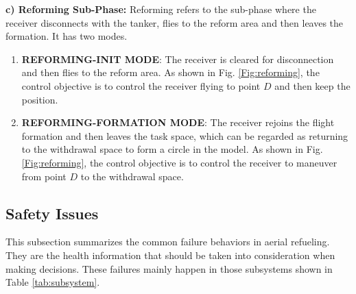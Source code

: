 \hspace{-1.5em}\textbf{c) Reforming Sub-Phase:} Reforming refers to the sub-phase where the receiver disconnects with the tanker, flies to the reform area and then leaves the formation. It has two modes.
\begin{enumerate}
	\item \textbf{REFORMING-INIT MODE}: The receiver is cleared for disconnection and then flies to the reform area. As shown in Fig. \ref{Fig:reforming}, the control objective is to control the receiver flying to point $ D $ and then keep the position.
	\item \textbf{REFORMING-FORMATION MODE}: The receiver rejoins the flight formation and then leaves the task space, which can be regarded as returning to the withdrawal space to form a circle in the model. As shown in Fig. \ref{Fig:reforming}, the control objective is to control the receiver to maneuver from point $D$ to the withdrawal space.
\end{enumerate}





\subsection{Safety Issues}
\label{sec:safetyissue}
This subsection summarizes the common failure behaviors in aerial refueling. They are the health information that should be taken into consideration when making decisions. These failures mainly happen in those subsystems shown in Table \ref{tab:subsystem}.

